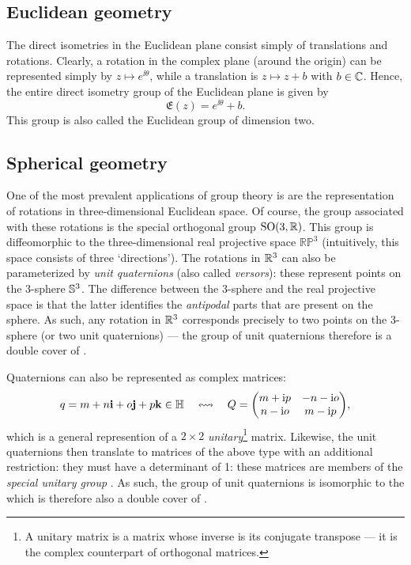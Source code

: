 \subsection{Euclidean geometry}
The direct isometries in the Euclidean plane consist simply of translations and rotations. Clearly, a rotation in the complex plane (around the origin) can be represented simply by \(z \mapsto e^{\ii \theta}\), while a translation is \(z \mapsto z + b\) with \(b \in \mathbb{C}\). Hence, the entire direct isometry group of the Euclidean plane is given by
    \[ \mathfrak{E}(z) = e^{\ii\theta} + b. \]
This group is also called the Euclidean group of dimension two.
\subsection{Spherical geometry}
One of the most prevalent applications of group theory is are the representation of rotations in three-dimensional Euclidean space. Of course, the group associated with these rotations is the special orthogonal group \(\mathrm{SO}(3, \mathbb{R})\). This group is diffeomorphic to the three-dimensional real projective space \(\mathbb{RP}^3\) (intuitively, this space consists of three `directions'). The rotations in \(\mathbb{R}^3\) can also be parameterized by \emph{unit quaternions} (also called \emph{versors}): these represent points on the 3-sphere \(\mathbb{S}^{3}\). The difference between the 3-sphere and the real projective space is that the latter identifies the \emph{antipodal} parts that are present on the sphere. As such, any rotation in \(\mathbb{R}^3\) corresponds precisely to two points on the 3-sphere (or two unit quaternions) --- the group of unit quaternions therefore is a double cover of \sogroup. 

Quaternions can also be represented as complex matrices: \cite{Stillwell2008}
\[ q = \quat{m}{n}{o}{p} \in \quaternions \corresponds Q = \mqty(m + \ii p & -n - \ii o\\n - \ii o & m - \ii p),\]
which is a general represention of a \(2\times 2\) \emph{unitary}\footnote{A unitary matrix is a matrix whose inverse is its conjugate transpose --- it is the complex counterpart of orthogonal matrices.} matrix. Likewise, the unit quaternions then translate to matrices of the above type with an additional restriction: they must have a determinant of 1: these matrices are members of the \emph{special unitary group} . As such, the group of unit quaternions is isomorphic to the  which is therefore also a double cover of \sogroup.

